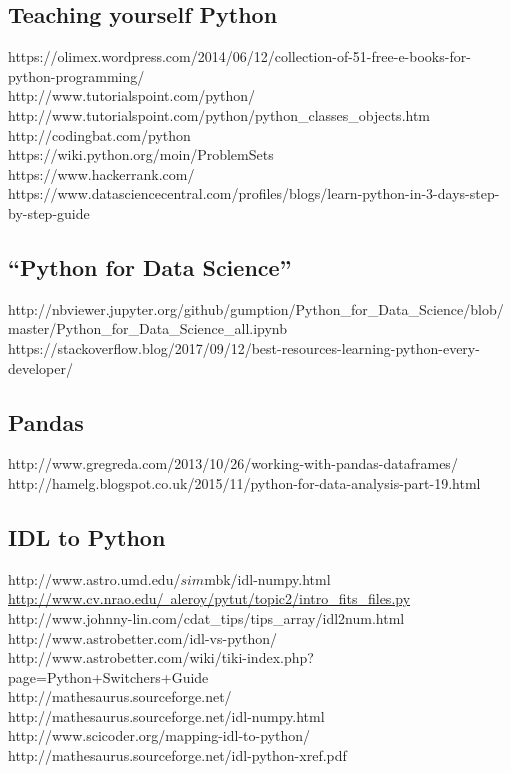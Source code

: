 \documentclass[11pt,a4paper]{article}
\begin{document}
\subsection*{Teaching yourself Python}
https://olimex.wordpress.com/2014/06/12/collection-of-51-free-e-books-for-python-programming/\\
http://www.tutorialspoint.com/python/\\
http://www.tutorialspoint.com/python/python\_classes\_objects.htm\\
http://codingbat.com/python\\
https://wiki.python.org/moin/ProblemSets\\
https://www.hackerrank.com/\\
https://www.datasciencecentral.com/profiles/blogs/learn-python-in-3-days-step-by-step-guide\\

\subsection*{``Python for Data Science'' }
http://nbviewer.jupyter.org/github/gumption/Python\_for\_Data\_Science/blob/master/Python\_for\_Data\_Science\_all.ipynb \\
https://stackoverflow.blog/2017/09/12/best-resources-learning-python-every-developer/\\

\subsection*{Pandas}
http://www.gregreda.com/2013/10/26/working-with-pandas-dataframes/ \\
http://hamelg.blogspot.co.uk/2015/11/python-for-data-analysis-part-19.html \\


\subsection*{IDL to Python}
http://www.astro.umd.edu/$sim$mbk/idl-numpy.html\\
\href{http://www.cv.nrao.edu/~aleroy/pytut/topic2/intro\_fits\_files.py}{http://www.cv.nrao.edu/~aleroy/pytut/topic2/intro\_fits\_files.py} \\
http://www.johnny-lin.com/cdat\_tips/tips\_array/idl2num.html\\
http://www.astrobetter.com/idl-vs-python/ \\
http://www.astrobetter.com/wiki/tiki-index.php?page=Python+Switchers+Guide \\
http://mathesaurus.sourceforge.net/\\
http://mathesaurus.sourceforge.net/idl-numpy.html\\
http://www.scicoder.org/mapping-idl-to-python/\\
http://mathesaurus.sourceforge.net/idl-python-xref.pdf\\
\end{document}
